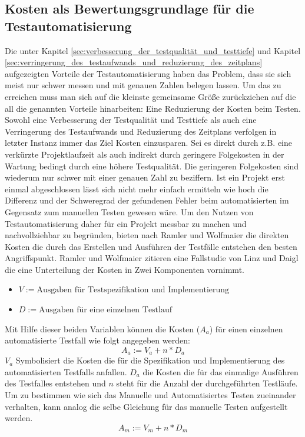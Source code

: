 \subsection{Kosten als Bewertungsgrundlage für die Testautomatisierung}
\label{sec:kosten_der_testautomatisierung}
Die unter Kapitel \ref{sec:verbesserung_der_testqualität_und_testtiefe} und Kapitel \ref{sec:verringerung_des_testaufwands_und_reduzierung_des_zeitplans} aufgezeigten Vorteile der Testautomatisierung haben das Problem, dass sie sich meist nur schwer messen und mit genauen Zahlen belegen lassen.
Um das zu erreichen muss man sich auf die kleinste gemeinsame Größe zurückziehen auf die all die genannten Vorteile hinarbeiten: Eine Reduzierung der Kosten beim Testen.
Sowohl eine Verbesserung der Testqualität und Testtiefe als auch eine Verringerung des Testaufwands und Reduzierung des Zeitplans verfolgen in letzter Instanz immer das Ziel Kosten einzusparen. Sei es direkt durch z.B. eine verkürzte Projektlaufzeit als auch indirekt durch geringere Folgekosten in der Wartung bedingt durch eine höhere Testqualität.
Die geringeren Folgekosten sind wiederum nur schwer mit einer genauen Zahl zu beziffern. Ist ein Projekt erst einmal abgeschlossen lässt sich nicht mehr einfach ermitteln wie hoch die Differenz und der Schweregrad der gefundenen Fehler beim automatisierten im Gegensatz zum manuellen Testen gewesen wäre.
Um den Nutzen von Testautomatisierung daher für ein Projekt messbar zu machen und nachvollziehbar zu begründen, bieten nach Ramler und Wolfmaier \cite{ramler_economic_2006} die direkten Kosten die durch das Erstellen und Ausführen der Testfälle entstehen den besten Angriffspunkt. 
Ramler und Wolfmaier \cite{ramler_economic_2006} zitieren eine Fallstudie von Linz und Daigl \cite{dustin_automated_1999} die eine Unterteilung der Kosten in Zwei Komponenten vornimmt.
\begin{itemize}
    \item[] \(V:=\text{Ausgaben für Testspezifikation und Implementierung}\)
    \item[] \(D:=\text{Ausgaben für eine einzelnen Testlauf}\)
\end{itemize}

Mit Hilfe dieser beiden Variablen können die Kosten (\(A_a\)) für einen einzelnen automatisierte Testfall wie folgt angegeben werden:
\begin{equation}
A_a:=V_a+n*D_a
\end{equation}
\(V_a\) Symbolisiert die Kosten die für die Spezifikation und Implementierung des automatisierten Testfalls anfallen. \(D_a\) die Kosten die für das einmalige Ausführen des Testfalles entstehen und \(n\) steht für die Anzahl der durchgeführten Testläufe.
Um zu bestimmen wie sich das Manuelle und Automatisiertes Testen zueinander verhalten, kann analog die selbe Gleichung für das manuelle Testen aufgestellt werden.
\begin{equation}
A_m:=V_m+n*D_m
\end{equation}

